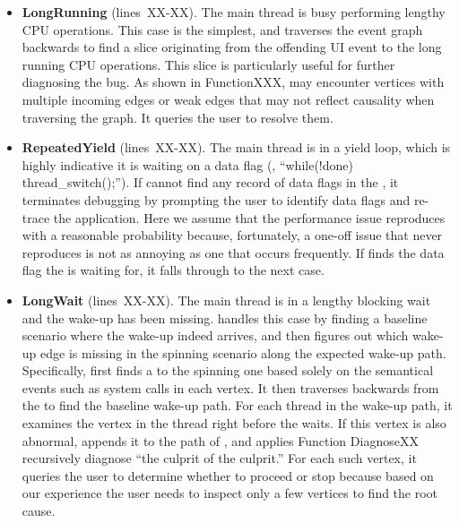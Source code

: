 \begin{itemize}

  \item \textbf{LongRunning} (lines~XX-XX). The main thread is busy
    performing lengthy CPU operations.  This case is the simplest, and
    \xxx traverses the event graph backwards to find a slice originating
    from the offending UI event to the long running CPU operations.  This
    slice is particularly useful for further diagnosing the bug.  As shown
    in FunctionXXX, \xxx may encounter vertices with multiple incoming edges
    or weak edges that may not reflect causality when traversing the
    graph.  It queries the user to resolve them.

  \item \textbf{RepeatedYield} (lines~XX-XX). The main thread is in a
    yield loop, which is highly indicative it is waiting on a data flag
    (\eg, ``while(!done) thread\_switch();'').  If \xxx cannot find any
    record of data flags in the \spinningnode, it terminates debugging by
    prompting the user to identify data flags and re-trace the
    application.  Here we assume that the performance issue reproduces
    with a reasonable probability because, fortunately, a one-off issue
    that never reproduces is not as annoying as one that occurs
    frequently.  If \xxx finds the data flag the \spinningnode is waiting
    for, it falls through to the next case.

  \item \textbf{LongWait} (lines~XX-XX). The main thread is in a lengthy
    blocking wait and the wake-up has been missing.  \xxx handles this
    case by finding a baseline scenario where the wake-up indeed arrives,
    and then figures out which wake-up edge is missing in the spinning
    scenario along the expected wake-up path.  Specifically, \xxx first
    finds a \similarnode to the spinning one based solely on the
    semantical events such as system calls in each vertex.  It then
    traverses backwards from the \similarnode to find the baseline wake-up
    path.  For each thread in the wake-up path, it examines the vertex in
    the thread right before the \spinningnode waits.  If this vertex is also
    abnormal, \xxx appends it to the path of \rootcausenodes, and applies
    Function DiagnoseXX recursively diagnose ``the culprit of the
    culprit.''  For each such vertex, it queries the user to determine
    whether to proceed or stop because based on our experience the user
    needs to inspect only a few vertices to find the root cause.

\end{itemize}
